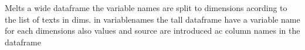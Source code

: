 \documentclass[letterpaper,10pt,english]{sphinxmanual}
\begin{document}
\begin{fulllineitems}
\label{\detokenize{vis/modelvis:modelvis.meltdim}}
\pysigstartsignatures
{}
\pysigstopsignatures
\sphinxAtStartPar
Melts a wide dataframe the variable names are split to dimensions acording
to the list of texts in dims. in variablenames
the tall dataframe have a variable name for each dimensions
also values and source are introduced ac column names in the dataframe

\end{fulllineitems}

\end{document}
